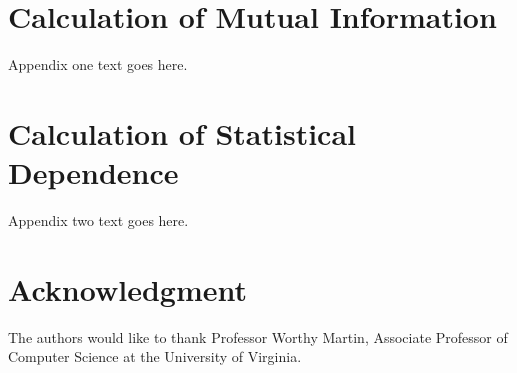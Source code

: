 \documentclass[journal]{./sty/IEEEtran}
\begin{document}
\section{Calculation of Mutual Information}
Appendix one text goes here.

\section{Calculation of Statistical Dependence}
Appendix two text goes here.


\section*{Acknowledgment}


The authors would like to thank Professor Worthy Martin, Associate Professor of Computer Science at the University of Virginia.


\ifCLASSOPTIONcaptionsoff
  \newpage
\fi





%
%
%
\end{document}
